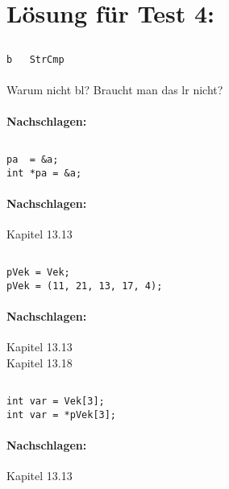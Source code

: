 
\section{Lösung für Test 4:}

\subsection{}
\begin{lstlisting}
b	StrCmp
\end{lstlisting}
\paragraph{} Warum nicht bl? Braucht man das lr nicht?
\paragraph*{Nachschlagen:}

\subsection{}
\begin{lstlisting}
pa	= &a;
int *pa = &a;
\end{lstlisting}
\paragraph*{Nachschlagen:}
Kapitel 13.13

\subsection{}
\begin{lstlisting}
pVek = Vek;
pVek = (11, 21, 13, 17, 4);
\end{lstlisting}
\paragraph*{Nachschlagen:}
Kapitel 13.13\\
Kapitel 13.18

\subsection{}
\begin{lstlisting}
int var = Vek[3];
int var = *pVek[3];
\end{lstlisting}
\paragraph*{Nachschlagen:}
Kapitel 13.13

